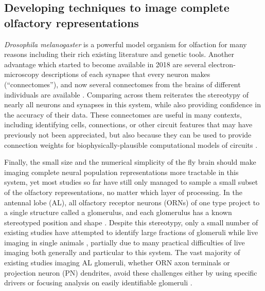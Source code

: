 \documentclass[12pt]{caltech_thesis}
\renewcommand{\cite}{{ }\autocite}
\let\Oldsection\section
\renewcommand{\section}{\FloatBarrier\Oldsection}
\begin{document}
\begin{refsection}
\section{Developing techniques to image complete olfactory representations}
\textit{Drosophila melanogaster} is a powerful model organism for olfaction for many reasons including their rich existing literature\cite{Wilson2013} and genetic tools.
Another advantage which started to become available in 2018 are several electron-microscopy descriptions of each synapse that every neuron makes (``connectomes''), and now several connectomes from the brains of different individuals are available\cite{Hemibrain,FAFB0,FAFB1,FemaleConnectome,MaleCNS}.
Comparing across them reiterates the stereotypy of nearly all neurons and synapses in this system, while also providing confidence in the accuracy of their data.
These connectomes are useful in many contexts, including identifying cells, connections, or other circuit features that may have previously not been appreciated, but also because they can be used to provide connection weights for biophysically-plausible computational models of circuits\cite{Liu2022}.

Finally, the small size and the numerical simplicity of the fly brain should make imaging complete neural population representations more tractable in this system, yet most studies so far have still only managed to sample a small subset of the olfactory representations, no matter which layer of processing.
In the antennal lobe (AL), all olfactory receptor neurons (ORNs) of one type project to a single structure called a glomerulus, and each glomerulus has a known stereotyped position and shape\cite{EarlyALAtlas,ALAtlas}.
Despite this stereotypy, only a small number of existing studies have attempted to identify large fractions of glomeruli while live imaging in single animals\cite{Badel2016,Endo2020}, partially due to many practical difficulties of live imaging both generally and particular to this system.
The vast majority of existing studies imaging AL glomeruli, whether ORN axon terminals or projection neuron (PN) dendrites, avoid these challenges either by using specific drivers or focusing analysis on easily identifiable glomeruli\cite{Wilson2004,Silbering2007,Zocchi2022,ComparativeDrosImaging}.



\end{refsection}
\end{document}
